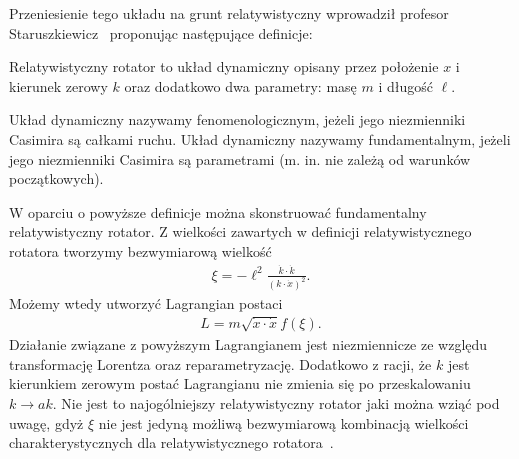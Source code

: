 Przeniesienie tego układu na grunt relatywistyczny wprowadził 
profesor Staruszkiewicz~\cite{star2008} proponując następujące 
definicje:
\begin{definition}
Relatywistyczny rotator to układ dynamiczny
 opisany przez położenie $x$ i kierunek
zerowy $k$ oraz dodatkowo dwa parametry: masę $m$ i długość $\ell$.
\end{definition}
\begin{definition}
Układ dynamiczny  nazywamy fenomenologicznym, 
jeżeli jego niezmienniki Casimira są 
całkami ruchu. Układ dynamiczny nazywamy 
fundamentalnym, jeżeli jego niezmienniki
Casimira są parametrami (m. in. nie zależą od warunków początkowych).
\end{definition}
W oparciu o powyższe definicje można skonstruować fundamentalny
relatywistyczny rotator. Z wielkości zawartych w definicji relatywistycznego 
rotatora tworzymy bezwymiarową wielkość
\begin{align*}
\xi = - \ell^2 \frac{\dot{k} \cdot \dot{k}}{ ( k \cdot \dot{x})^2 }.
\end{align*}
Możemy wtedy utworzyć Lagrangian postaci
\begin{align}\label{rotatorStar}
L = m \sqrt{ \dot{x} \cdot \dot{x} } f( \xi ) .
\end{align}
Działanie związane z powyższym Lagrangianem 
jest niezmiennicze ze względu transformację Lorentza oraz reparametryzację.
 Dodatkowo z racji, że $k$ jest kierunkiem zerowym postać Lagrangianu 
nie zmienia się po przeskalowaniu $k \to a k$. 
Nie jest to najogólniejszy relatywistyczny 
rotator jaki można wziąć pod uwagę, gdyż $\xi$ nie jest jedyną 
możliwą bezwymiarową kombinacją wielkości charakterystycznych 
dla relatywistycznego rotatora~\cite{Bratek2009nonuniq}.


